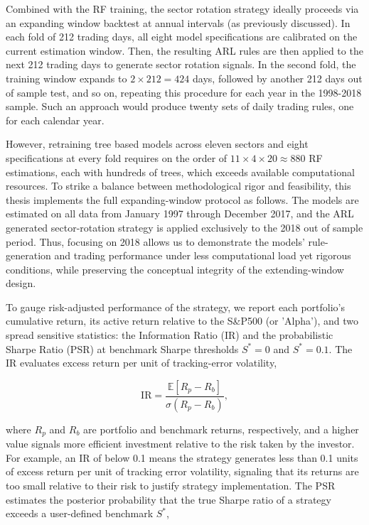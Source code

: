 Combined with the RF training, the sector rotation strategy ideally proceeds via an expanding window backtest at annual intervals (as previously discussed). In each fold of 212 trading days, all eight model specifications are calibrated on the current estimation window. Then, the resulting ARL rules are then applied to the next 212 trading days to generate sector rotation signals. In the second fold, the training window expands to $2\times212=424$ days, followed by another 212 days out of sample test, and so on, repeating this procedure for each year in the 1998-2018 sample. Such an approach would produce twenty sets of daily trading rules, one for each calendar year.

However, retraining tree based models across eleven sectors and eight specifications at every fold requires on the order of $11\times4\times20\approx880$ RF estimations, each with hundreds of trees, which exceeds available computational resources. To strike a balance between methodological rigor and feasibility, this thesis implements the full expanding-window protocol as follows. The models are estimated on all data from January 1997 through December 2017, and the ARL generated sector-rotation strategy is applied exclusively to the 2018 out of sample period. Thus, focusing on 2018 allows us to demonstrate the models' rule-generation and trading performance under less computational load yet rigorous conditions, while preserving the conceptual integrity of the extending-window design.


To gauge risk-adjusted performance of the strategy, we report each portfolio's cumulative return, its active return relative to the S\&P500 (or 'Alpha'), and two spread sensitive statistics: the Information Ratio (IR) and the probabilistic Sharpe Ratio (PSR) at benchmark Sharpe thresholds $S^{*}=0$ and $S^{*}=0.1$. The IR evaluates excess return per unit of tracking-error volatility,

\begin{equation}
\mathrm{IR}=\frac{\mathbb{E}\left[R_{p}-R_{b}\right]}{\sigma\left(R_{p}-R_{b}\right)},
\end{equation}

where $R_{p}$ and $R_{b}$ are portfolio and benchmark returns, respectively, and a higher value signals more efficient investment relative to the risk taken by the investor. For example, an IR of below 0.1 means the strategy generates less than 0.1 units of excess return per unit of tracking error volatility, signaling that its returns are too small relative to their risk to justify strategy implementation. The PSR estimates the posterior probability that the true Sharpe ratio of a strategy exceeds a user-defined benchmark $S^{*}$,

